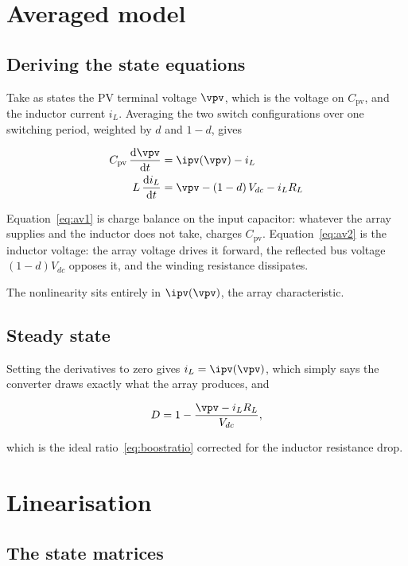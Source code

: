\section{Averaged model}

\subsection{Deriving the state equations}

Take as states the PV terminal voltage $\vpv$, which is the voltage on
$C_{\mathrm{pv}}$, and the inductor current $i_L$. Averaging the two switch
configurations over one switching period, weighted by $d$ and $1-d$, gives

\begin{align}
C_{\mathrm{pv}}\,\frac{\mathrm{d}\vpv}{\mathrm{d}t} &= \ipv(\vpv) - i_L \label{eq:av1}\\
L\,\frac{\mathrm{d}i_L}{\mathrm{d}t} &= \vpv - (1-d)\,V_{dc} - i_L R_L \label{eq:av2}
\end{align}

Equation~\eqref{eq:av1} is charge balance on the input capacitor: whatever the
array supplies and the inductor does not take, charges $C_{\mathrm{pv}}$.
Equation~\eqref{eq:av2} is the inductor voltage: the array voltage drives it
forward, the reflected bus voltage $(1-d)V_{dc}$ opposes it, and the winding
resistance dissipates.

The nonlinearity sits entirely in $\ipv(\vpv)$, the array characteristic.

\subsection{Steady state}

Setting the derivatives to zero gives $i_L = \ipv(\vpv)$, which simply says the
converter draws exactly what the array produces, and

\begin{equation}
D = 1 - \frac{\vpv - i_L R_L}{V_{dc}},
\label{eq:dutyexact}
\end{equation}

which is the ideal ratio~\eqref{eq:boostratio} corrected for the inductor
resistance drop.

\section{Linearisation}

\subsection{The state matrices}


